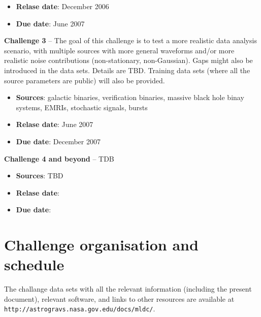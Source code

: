 \documentclass[11pt]{report}
\begin{document}
\begin{description}
\begin{itemize}
\item {\bf Relase date}: December 2006

\item {\bf Due date}: June 2007

\end{itemize}

\item{{\bf Challenge 3}} -- The goal of this challenge is to test a more realistic data analysis scenario, with multiple sources with more general waveforms and/or more realistic noise contributions (non-stationary, non-Gaussian). Gaps might also be introduced in the data sets. Details are TBD. Training data sets (where all the source parameters are public) will also be provided. 

\begin{itemize}

\item {\bf Sources}: galactic binaries, verification binaries, massive black hole binay systems, EMRIs, stochastic signals, bursts


\item {\bf Relase date}: June 2007

\item {\bf Due date}: December 2007

\end{itemize}

\item{{\bf Challenge 4 and beyond}} -- TDB

\begin{itemize}

\item {\bf Sources}: TBD

\item {\bf Relase date}:

\item {\bf Due date}:

\end{itemize}

\end{description}

\section{Challenge organisation and schedule}

The challange data sets with all the relevant information (including the present document), relevant software, and links to other resources are available at {\tt http://astrogravs.nasa.gov.edu/docs/mldc/}.
\end{document}

